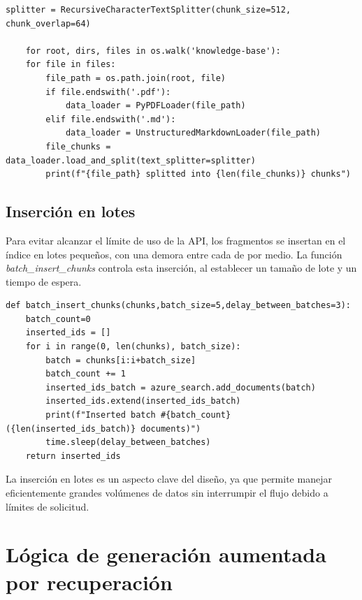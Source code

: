 \begin{lstlisting}[label=cod:update-db-5,caption=Divisor de texto.]
	splitter = RecursiveCharacterTextSplitter(chunk_size=512, chunk_overlap=64)

	for root, dirs, files in os.walk('knowledge-base'):
    for file in files:
        file_path = os.path.join(root, file)
        if file.endswith('.pdf'):
            data_loader = PyPDFLoader(file_path)
        elif file.endswith('.md'):
            data_loader = UnstructuredMarkdownLoader(file_path)
        file_chunks = data_loader.load_and_split(text_splitter=splitter)
        print(f"{file_path} splitted into {len(file_chunks)} chunks")
\end{lstlisting}

\subsection{Inserción en lotes}

Para evitar alcanzar el límite de uso de la API, los fragmentos se insertan en el índice en lotes pequeños, con una demora entre cada de por medio. 
La función \textit{batch\_insert\_chunks} controla esta inserción, al establecer un tamaño de lote y un tiempo de espera.

\begin{lstlisting}[label=cod:update-db-6,caption=Inserción en lotes.]
	def batch_insert_chunks(chunks,batch_size=5,delay_between_batches=3):
    batch_count=0
    inserted_ids = []
    for i in range(0, len(chunks), batch_size):
        batch = chunks[i:i+batch_size]
        batch_count += 1
        inserted_ids_batch = azure_search.add_documents(batch)
        inserted_ids.extend(inserted_ids_batch)
        print(f"Inserted batch #{batch_count} ({len(inserted_ids_batch)} documents)")
        time.sleep(delay_between_batches)
    return inserted_ids
\end{lstlisting}

La inserción en lotes es un aspecto clave del diseño, ya que permite manejar eficientemente grandes volúmenes de datos sin interrumpir
el flujo debido a límites de solicitud.

\vspace{8mm}

\section{Lógica de generación aumentada por recuperación}

